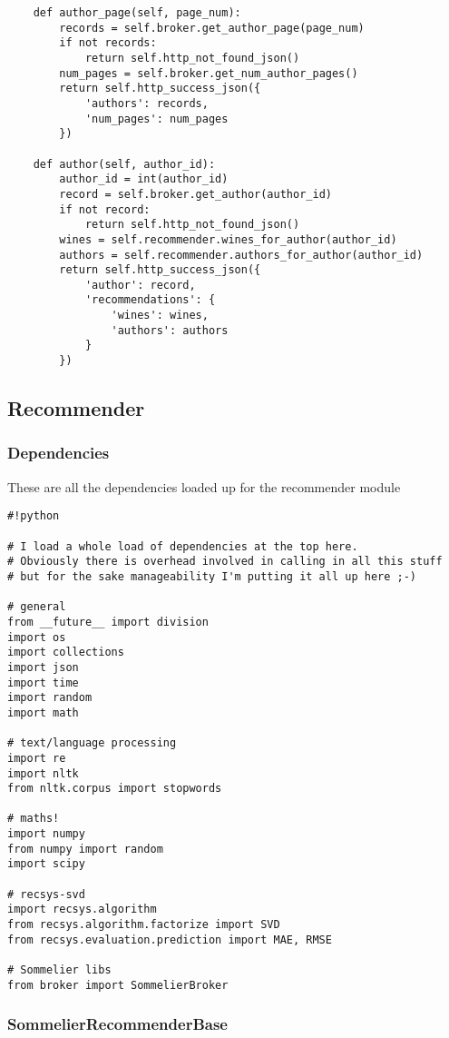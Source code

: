 \begin{verbatim}
    def author_page(self, page_num):
        records = self.broker.get_author_page(page_num)
        if not records:
            return self.http_not_found_json()
        num_pages = self.broker.get_num_author_pages()
        return self.http_success_json({
            'authors': records, 
            'num_pages': num_pages 
        })

    def author(self, author_id):
        author_id = int(author_id)
        record = self.broker.get_author(author_id)
        if not record:
            return self.http_not_found_json()
        wines = self.recommender.wines_for_author(author_id)
        authors = self.recommender.authors_for_author(author_id)
        return self.http_success_json({
            'author': record,
            'recommendations': {
                'wines': wines,
                'authors': authors
            }
        })
\end{verbatim}

\subsection{Recommender}

\subsubsection{Dependencies}

These are all the dependencies loaded up for the recommender module

\begin{verbatim}
#!python

# I load a whole load of dependencies at the top here. 
# Obviously there is overhead involved in calling in all this stuff
# but for the sake manageability I'm putting it all up here ;-)

# general
from __future__ import division
import os
import collections
import json
import time
import random
import math

# text/language processing
import re
import nltk
from nltk.corpus import stopwords

# maths!
import numpy
from numpy import random
import scipy

# recsys-svd
import recsys.algorithm
from recsys.algorithm.factorize import SVD
from recsys.evaluation.prediction import MAE, RMSE

# Sommelier libs
from broker import SommelierBroker
\end{verbatim}

\subsubsection{SommelierRecommenderBase}

